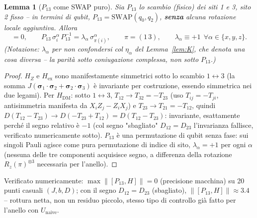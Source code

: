 \documentclass[11pt,a4paper]{article}
\newtheorem{lemma}{Lemma}
\begin{document}
\begin{lemma}[$P_{13}$ come SWAP puro]
\label{lem:P13}
Sia $P_{13}$ lo scambio (fisico) dei siti 1 e 3, sito 2 fisso -- in termini di qubit,
$P_{13}=\mathrm{SWAP}(q_0,q_2)$, \textbf{senza} alcuna rotazione locale aggiuntiva. Allora
\begin{equation}
[P_{13},H]=0,\qquad P_{13}\,\sigma_i^\alpha\,P_{13}^{-1}=\lambda_\alpha\,\sigma_{\pi(i)}^\alpha,
\qquad \pi=(1\,3),\qquad \lambda_\alpha\equiv+1\ \ \forall\alpha\in\{x,y,z\}.
\end{equation}
(Notazione: $\lambda_\alpha$ per non confondersi col $\eta_\alpha$ del Lemma~\ref{lem:K}, che
denota una cosa diversa -- la parità sotto coniugazione complessa, non sotto $P_{13}$.)
\end{lemma}
\begin{proof}
$H_Z$ e $H_{\mathrm{ex}}$ sono manifestamente simmetrici sotto lo scambio $1\leftrightarrow3$
(la somma $J(\boldsymbol\sigma_1\!\cdot\!\boldsymbol\sigma_2+\boldsymbol\sigma_2\!\cdot\!
\boldsymbol\sigma_3)$ è invariante per costruzione, essendo simmetrica nei due legami). Per
$H_{\mathrm{DM}}$: sotto $1\leftrightarrow3$, $T_{12}\to T_{32}=-T_{23}$ (uso
$T_{ij}=-T_{ji}$, antisimmetria manifesta da $X_iZ_j-Z_iX_j$) e $T_{23}\to T_{21}=-T_{12}$,
quindi $D(T_{12}-T_{23})\to D(-T_{23}+T_{12})=D(T_{12}-T_{23})$: invariante, esattamente perché
il segno relativo è $-1$ (col segno "sbagliato" $D_{12}=D_{23}$ l'invarianza fallisce, verificato
numericamente sotto). $P_{13}$ è una permutazione di qubit senza fase: sui singoli Pauli agisce
come pura permutazione di indice di sito, $\lambda_\alpha=+1$ per ogni $\alpha$ (nessuna delle tre
componenti acquisisce segno, a differenza della rotazione $R_z(\pi)^{\otimes3}$ necessaria per
l'anello).
\end{proof}
Verificato numericamente: $\max\|[P_{13},H]\|=0$ (precisione macchina) su 20 punti casuali
$(J,b,D)$; con il segno $D_{12}=D_{23}$ (sbagliato), $\|[P_{13},H]\|\approx3.4$ -- rottura netta,
non un residuo piccolo, stesso tipo di controllo già fatto per l'anello con $U_\text{naive}$.
\end{document}
